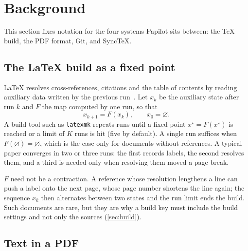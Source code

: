 \section{Background}
\label{sec:background}

This section fixes notation for the four systems Papilot sits between: the
\TeX{} build, the PDF format, Git, and SyncTeX.

\subsection{The \LaTeX{} build as a fixed point}

\LaTeX{} resolves cross-references, citations and the table of contents by
reading auxiliary data written by the previous run~\cite{lamport1994}. Let
$x_k$ be the auxiliary state after run $k$ and $F$ the map computed by one run,
so that
\begin{equation}
  x_{k+1} = F(x_k), \qquad x_0 = \varnothing .
  \label{eq:fixed-point}
\end{equation}
A build tool such as \texttt{latexmk} repeats runs until a fixed point
$x^{\star} = F(x^{\star})$ is reached or a limit of $K$ runs is hit (five by
default). A single run suffices when $F(\varnothing) = \varnothing$, which is
the case only for documents without references. A typical paper converges in
two or three runs: the first records labels, the second resolves them, and a
third is needed only when resolving them moved a page break.

\begin{remark}
$F$ need not be a contraction. A reference whose resolution lengthens a line
can push a label onto the next page, whose page number shortens the line again;
the sequence $x_k$ then alternates between two states and the run limit ends
the build. Such documents are rare, but they are why a build key must include
the build settings and not only the sources (\cref{sec:build}).
\end{remark}

\subsection{Text in a PDF}

